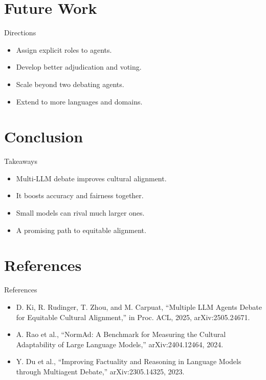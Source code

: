 \documentclass{beamer}
\begin{document}
\section{Future Work}
\begin{frame}{Directions}
\begin{itemize}
\item Assign explicit roles to agents.
\item Develop better adjudication and voting.
\item Scale beyond two debating agents.
\item Extend to more languages and domains.
\end{itemize}
\end{frame}

\section{Conclusion}
\begin{frame}{Takeaways}
\begin{itemize}
\item Multi-LLM debate improves cultural alignment.
\item It boosts accuracy and fairness together.
\item Small models can rival much larger ones.
\item A promising path to equitable alignment.
\end{itemize}
\end{frame}

\section{References}
\begin{frame}{References}
\footnotesize
\begin{itemize}
\item D. Ki, R. Rudinger, T. Zhou, and M. Carpuat, ``Multiple LLM Agents Debate for Equitable Cultural Alignment,'' in Proc. ACL, 2025, arXiv:2505.24671.
\item A. Rao et al., ``NormAd: A Benchmark for Measuring the Cultural Adaptability of Large Language Models,'' arXiv:2404.12464, 2024.
\item Y. Du et al., ``Improving Factuality and Reasoning in Language Models through Multiagent Debate,'' arXiv:2305.14325, 2023.
\end{itemize}
\end{frame}
\begin{frame}\vfill{}\vfill\end{frame}
\end{document}
